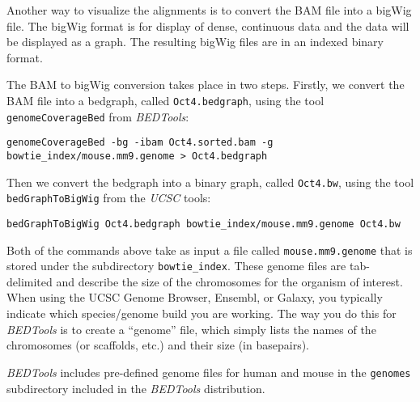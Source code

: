 \begin{note}
Another way to visualize the alignments is to convert the BAM file into a bigWig
file. The bigWig format is for display of dense, continuous data and the data
will be displayed as a graph. The resulting bigWig files are in an indexed
binary format.
\end{note}

\begin{steps}
The BAM to bigWig conversion takes place in two steps. Firstly, we convert the
BAM file into a bedgraph, called \texttt{Oct4.bedgraph}, using the tool
\texttt{genomeCoverageBed} from \emph{BEDTools}:

\begin{lstlisting}
genomeCoverageBed -bg -ibam Oct4.sorted.bam -g bowtie_index/mouse.mm9.genome > Oct4.bedgraph
\end{lstlisting}

Then we convert the bedgraph into a binary graph, called \texttt{Oct4.bw}, using the
tool \texttt{bedGraphToBigWig} from the \emph{UCSC} tools:

\begin{lstlisting}
bedGraphToBigWig Oct4.bedgraph bowtie_index/mouse.mm9.genome Oct4.bw
\end{lstlisting}
\end{steps}

\begin{note}
Both of the commands above take as input a file called \texttt{mouse.mm9.genome} that
is stored under the subdirectory \texttt{bowtie\_index}. These genome files are
tab-delimited and describe the size of the chromosomes for the organism of
interest. When using the UCSC Genome Browser, Ensembl, or Galaxy, you typically
indicate which species/genome build you are working. The way you do this for
\emph{BEDTools} is to create a ``genome'' file, which simply lists the names of
the chromosomes (or scaffolds, etc.) and their size (in basepairs).

\emph{BEDTools} includes pre-defined genome files for human and mouse in the
\texttt{genomes} subdirectory included in the \emph{BEDTools} distribution.
\end{note}

